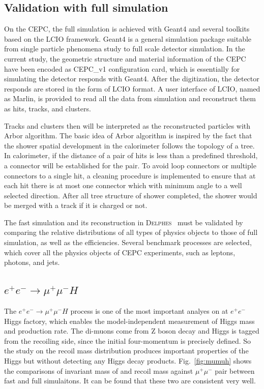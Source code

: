 \documentclass[a4paper,10pt,twoside]{cpc-hepnp}
\begin{document}
\begin{multicols}{2}
\section{Validation with full simulation\label{sec:validation}}


On the CEPC, the full simulation is achieved with Geant4 and several toolkits based on the LCIO framework\cite{ref:lcio}.
Geant4\cite{ref:geant4} is a general simulation package suitable from single particle phenomena study to full scale detector simulation.
In the current study, the geometric structure and material information of the CEPC have been encoded as CEPC\_v1 configuration card,
which is essentially for simulating the detector responds with Geant4.
After the digitization, the detector responds are stored in the form of LCIO format.
A user interface of LCIO, named as Marlin, is provided to read all the data from simulation and reconstruct them as hits, tracks, and clusters.

Tracks and clusters then will be interpreted as the reconstructed particles with Arbor algorithm\cite{ref:arbor}.
The basic idea of Arbor algorithm is inspired by the fact that the shower spatial development  in the calorimeter follows the topology of a tree.
In calorimeter, if the distance of a pair of hits is less than a predefined threshold, a connector will be established for the pair.
To avoid loop connectors or multiple connectors to a single hit,
a cleaning procedure is implemented to ensure that at each hit there is at most one connector which with minimum angle
to a well selected direction.
After all tree structure of shower completed, the shower would be merged with a track if it is charged or not.


The fast simulation and its reconstruction in {\textsc{Delphes}~} must be validated by comparing the relative distributions
of all types of physics objects to those of full simulation, as well as the efficiencies.
Several benchmark processes are selected, which cover all the physics objects of CEPC experiments, such as leptons, photons, and jets.


\subsection{$e^+e^-\to \mu^+\mu^-H$}

The $e^+e^- \to \mu^+\mu^-H$ process is one of the most important analyes on at $e^+e^-$ Higgs factory,
which enables the model-independent measurement of Higgs mass and production rate.
The di-muons come from Z boson decay and Higgs is tagged from the recoiling side, since the initial four-momentum is precisely defined.
So the study on the recoil mass distribution produces important properties of the Higgs but without detecting any Higgs decay products.
Fig.~\ref{fig:mumuh} shows the comparisons of invariant mass of and recoil mass against $\mu^+\mu^-$ pair between fast and full simulaitons.
It can be found that these two are consistent very well.


\end{multicols}
\end{document}
